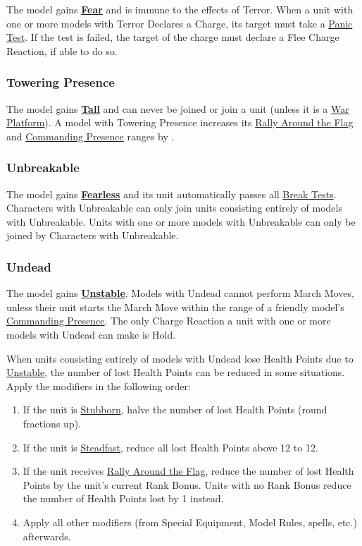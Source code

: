 The model gains \hyperref[fear]{\textbf{Fear}} and is immune to the effects of Terror. When a unit with one or more models with Terror Declares a Charge, its target must take a \hyperref[panic_test]{Panic Test}. If the test is failed, the target of the charge must declare a Flee Charge Reaction, if able to do so. 

\subsubsection{Towering Presence}
\label{towering_presence}

The model gains \hyperref[tall]{\textbf{Tall}} and can never be joined or join a unit (unless it is a \hyperref[war_platform]{War Platform}). A model with Towering Presence increases its \hyperref[rally_around_the_flag]{Rally Around the Flag} and \hyperref[commanding_presence]{Commanding Presence} ranges by .

\subsubsection{Unbreakable}
\label{unbreakable}

The model gains \hyperref[fearless]{\textbf{Fearless}} and its unit automatically passes all \hyperref[break_test]{Break Tests}. Characters with Unbreakable can only join units consisting entirely of models with Unbreakable. Units with one or more models with Unbreakable can only be joined by Characters with Unbreakable.

\subsubsection{Undead}
\label{undead}

The model gains \hyperref[unstable]{\textbf{Unstable}}. Models with Undead cannot perform March Moves, unless their unit starts the March Move within the range of a friendly model's \hyperref[commanding_presence]{Commanding Presence}. The only Charge Reaction a unit with one or more models with Undead can make is Hold.

When units consisting entirely of models with Undead lose Health Points due to \hyperref[unstable]{Unstable}, the number of lost Health Points can be reduced in some situations. Apply the modifiers in the following order:
\begin{enumerate}
\item If the unit is \hyperref[stubborn]{Stubborn}, halve the number of lost Health Points (round fractions up).
\item If the unit is \hyperref[steadfast]{Steadfast}, reduce all lost Health Points above 12 to 12.
\item If the unit receives \hyperref[rally_around_the_flag]{Rally Around the Flag}, reduce the number of lost Health Points by the unit's current Rank Bonus. Units with no Rank Bonus reduce the number of Health Points lost by 1 instead.
\item Apply all other modifiers (from Special Equipment, Model Rules, spells, etc.) afterwards.
\end{enumerate}

